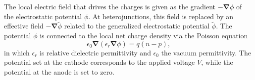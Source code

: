 \documentclass[%
9pt,
 aip,
rsi,%
 amsmath,amssymb,
preprint,%
]{revtex4-1}
\begin{document}
The local electric field that drives the charges is given as the gradient $-\mathbf{\nabla}\phi$ of the electrostatic potential $\phi$. 
At heterojunctions, this field is replaced by an effective field $-\mathbf{\nabla}\tilde{\phi}$ related to the generalized electrostatic potential $\tilde{\phi}$. 
The potential $\phi$ is connected to the local net charge density via the Poisson equation 
\begin{equation}
    \epsilon_0 \mathbf{\nabla} \left( \epsilon_r \mathbf{\nabla} \phi \right) = q \left(n-p\right), \label{eq:poisson}
\end{equation}
in which $\epsilon_r$ is relative dielectric permittivity and $\epsilon_0$ the vacuum permittivity.
The potential set at the cathode corresponds to the applied voltage $V$, while the potential at the anode is set to zero. 
\end{document}
